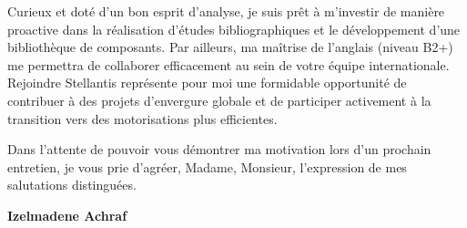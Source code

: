 \documentclass[10pt,a4paper]{altacv}
\begin{document}
\vspace{0.4cm}

Curieux et doté d'un bon esprit d'analyse, je suis prêt à m'investir de manière proactive dans la réalisation d'études bibliographiques et le développement d'une bibliothèque de composants. Par ailleurs, ma maîtrise de l'anglais (niveau B2+) me permettra de collaborer efficacement au sein de votre équipe internationale. Rejoindre Stellantis représente pour moi une formidable opportunité de contribuer à des projets d'envergure globale et de participer activement à la transition vers des motorisations plus efficientes.

\vspace{0.4cm}

Dans l'attente de pouvoir vous démontrer ma motivation lors d'un prochain entretien, je vous prie d'agréer, Madame, Monsieur, l'expression de mes salutations distinguées.

\vspace{0.5cm}

\vfill

\begin{flushright}
  \Large\color{emphasis}\textbf{Izelmadene Achraf}
\end{flushright}
\end{document}
